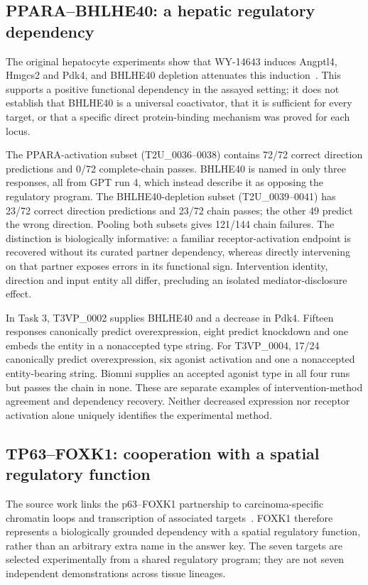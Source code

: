 \subsection{PPARA--BHLHE40: a hepatic regulatory dependency}
The original hepatocyte experiments show that WY-14643 induces Angptl4, Hmgcs2 and Pdk4, and BHLHE40 depletion attenuates this induction~\cite{kokki2026bhlhe40}. This supports a positive functional dependency in the assayed setting; it does not establish that BHLHE40 is a universal coactivator, that it is sufficient for every target, or that a specific direct protein-binding mechanism was proved for each locus.

The PPARA-activation subset (T2U\_0036--0038) contains 72/72 correct direction predictions and 0/72 complete-chain passes. BHLHE40 is named in only three responses, all from GPT run 4, which instead describe it as opposing the regulatory program. The BHLHE40-depletion subset (T2U\_0039--0041) has 23/72 correct direction predictions and 23/72 chain passes; the other 49 predict the wrong direction. Pooling both subsets gives 121/144 chain failures. The distinction is biologically informative: a familiar receptor-activation endpoint is recovered without its curated partner dependency, whereas directly intervening on that partner exposes errors in its functional sign. Intervention identity, direction and input entity all differ, precluding an isolated mediator-disclosure effect.

In Task 3, T3VP\_0002 supplies BHLHE40 and a decrease in Pdk4. Fifteen responses canonically predict overexpression, eight predict knockdown and one embeds the entity in a nonaccepted type string. For T3VP\_0004, 17/24 canonically predict overexpression, six agonist activation and one a nonaccepted entity-bearing string. Biomni supplies an accepted agonist type in all four runs but passes the chain in none. These are separate examples of intervention-method agreement and dependency recovery. Neither decreased expression nor receptor activation alone uniquely identifies the experimental method.

\subsection{TP63--FOXK1: cooperation with a spatial regulatory function}
The source work links the p63--FOXK1 partnership to carcinoma-specific chromatin loops and transcription of associated targets~\cite{jung2026foxk1}. FOXK1 therefore represents a biologically grounded dependency with a spatial regulatory function, rather than an arbitrary extra name in the answer key. The seven targets are selected experimentally from a shared regulatory program; they are not seven independent demonstrations across tissue lineages.

